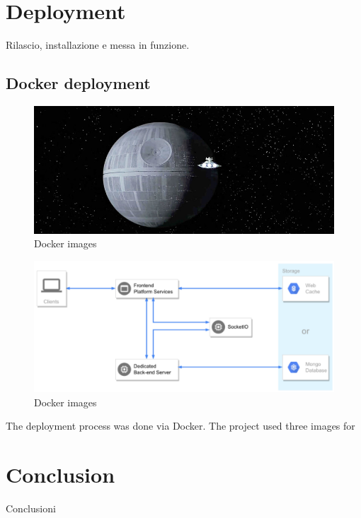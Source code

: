 \documentclass[multi, tikz]{article}
\begin{document}
\section{Deployment}
Rilascio, installazione e messa in funzione.
\subsection{Docker deployment}
\begin{figure}[h!]
  \centering
  \includegraphics[scale=0.44]{deathStar2.jpg}
  \caption{Docker images}
  \label{fig:deathstar}
\end{figure}


\begin{figure}[h!]
  \centering
  \includegraphics[scale=0.70]{src.pdf}
  \caption{Docker images}
  \label{fig:deathstar}
\end{figure}


The deployment process was done via Docker. The project used three images for

\section{Conclusion}
Conclusioni



\end{document}
